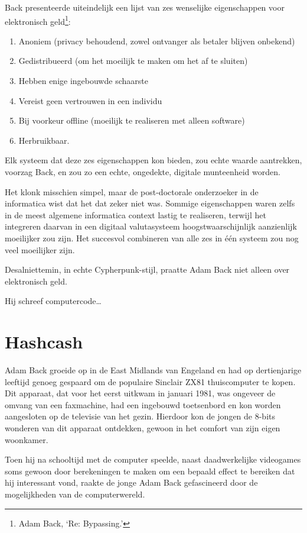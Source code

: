 \documentclass[
  a5paper,
  smalldemyvopaper,11pt,twoside,onecolumn,openright,extrafontsizes,
hidelinks]{memoir}
\providecommand{\tightlist}{%
  \setlength{\itemsep}{0pt}\setlength{\parskip}{0pt}}\usepackage{longtable,booktabs,array}
\begin{document}
Back presenteerde uiteindelijk een lijst van zes wenselijke
eigenschappen voor elektronisch geld\footnote{Adam Back, `Re:
  Bypassing.'}:

\begin{enumerate}
\def\labelenumi{\arabic{enumi}.}
\tightlist
\item
  Anoniem (privacy behoudend, zowel ontvanger als betaler blijven
  onbekend)
\item
  Gedistribueerd (om het moeilijk te maken om het af te sluiten)
\item
  Hebben enige ingebouwde schaarste
\item
  Vereist geen vertrouwen in een individu
\item
  Bij voorkeur offline (moeilijk te realiseren met alleen software)
\item
  Herbruikbaar.
\end{enumerate}

Elk systeem dat deze zes eigenschappen kon bieden, zou echte waarde
aantrekken, voorzag Back, en zou zo een echte, ongedekte, digitale
munteenheid worden.

Het klonk misschien simpel, maar de post-doctorale onderzoeker in de
informatica wist dat het dat zeker niet was. Sommige eigenschappen waren
zelfs in de meest algemene informatica context lastig te realiseren,
terwijl het integreren daarvan in een digitaal valutasysteem
hoogstwaarschijnlijk aanzienlijk moeilijker zou zijn. Het succesvol
combineren van alle zes in één systeem zou nog veel moeilijker zijn.

Desalniettemin, in echte Cypherpunk-stijl, praatte Adam Back niet alleen
over elektronisch geld.

Hij schreef computercode\ldots{}

\chapter{Hashcash}\label{hashcash}

Adam Back groeide op in de East Midlands van Engeland en had op
dertienjarige leeftijd genoeg gespaard om de populaire Sinclair ZX81
thuiscomputer te kopen. Dit apparaat, dat voor het eerst uitkwam in
januari 1981, was ongeveer de omvang van een faxmachine, had een
ingebouwd toetsenbord en kon worden aangesloten op de televisie van het
gezin. Hierdoor kon de jongen de 8-bits wonderen van dit apparaat
ontdekken, gewoon in het comfort van zijn eigen woonkamer.

Toen hij na schooltijd met de computer speelde, naast daadwerkelijke
videogames soms gewoon door berekeningen te maken om een bepaald effect
te bereiken dat hij interessant vond, raakte de jonge Adam Back
gefascineerd door de mogelijkheden van de computerwereld.
\end{document}

